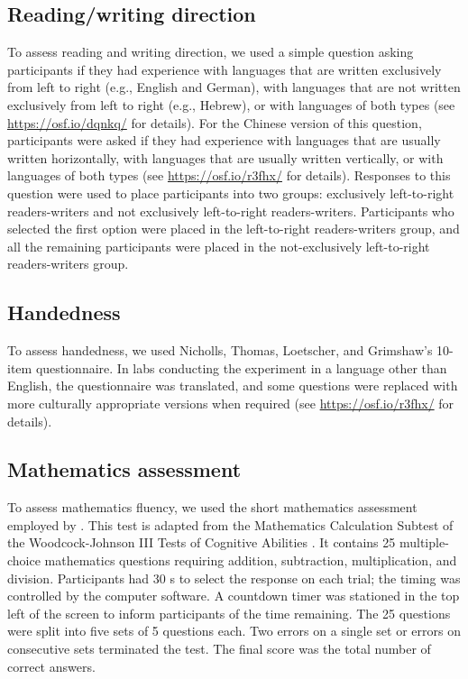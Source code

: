 \documentclass[man,floatsintext]{apa6}
\theoremstyle{definition}
\theoremstyle{definition}
\theoremstyle{definition}
\theoremstyle{remark}
\begin{document}
\subsection{Reading/writing direction}\label{readingwriting-direction}

To assess reading and writing direction, we used a simple question
asking participants if they had experience with languages that are
written exclusively from left to right (e.g., English and German), with
languages that are not written exclusively from left to right (e.g.,
Hebrew), or with languages of both types (see
\url{https://osf.io/dqnkq/} for details). For the Chinese version of
this question, participants were asked if they had experience with
languages that are usually written horizontally, with languages that are
usually written vertically, or with languages of both types (see
\url{https://osf.io/r3fhx/} for details). Responses to this question
were used to place participants into two groups: exclusively
left-to-right readers-writers and not exclusively left-to-right
readers-writers. Participants who selected the first option were placed
in the left-to-right readers-writers group, and all the remaining
participants were placed in the not-exclusively left-to-right
readers-writers group.

\subsection{Handedness}\label{handedness}

To assess handedness, we used Nicholls, Thomas, Loetscher, and
Grimshaw's \autocite*{Nicholls:2013ha} 10-item questionnaire. In labs
conducting the experiment in a language other than English, the
questionnaire was translated, and some questions were replaced with more
culturally appropriate versions when required (see
\url{https://osf.io/r3fhx/} for details).

\subsection{Mathematics assessment}\label{mathematics-assessment}

To assess mathematics fluency, we used the short mathematics assessment
employed by \textcite{Tibber:2013ho}. This test is adapted from the
Mathematics Calculation Subtest of the Woodcock-Johnson III Tests of
Cognitive Abilities \autocite{Woodcock:1989ww}. It contains 25
multiple-choice mathematics questions requiring addition, subtraction,
multiplication, and division. Participants had 30 s to select the
response on each trial; the timing was controlled by the computer
software. A countdown timer was stationed in the top left of the screen
to inform participants of the time remaining. The 25 questions were
split into five sets of 5 questions each. Two errors on a single set or
errors on consecutive sets terminated the test. The final score was the
total number of correct answers.
\end{document}
